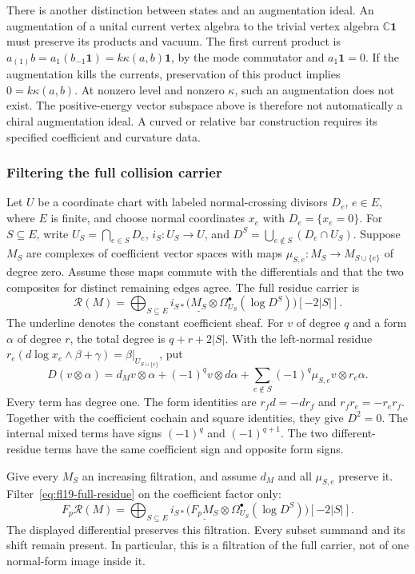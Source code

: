 There is another distinction between states and an augmentation ideal.
An augmentation of a unital current vertex algebra to the trivial vertex algebra $\mathbb C\mathbf1$ must preserve its products and vacuum.
The first current product is $a_{(1)}b=a_1(b_{-1}\mathbf1)=k\kappa(a,b)\mathbf1$, by the mode commutator and $a_1\mathbf1=0$.
If the augmentation kills the currents, preservation of this product implies $0=k\kappa(a,b)$.
At nonzero level and nonzero $\kappa$, such an augmentation does not exist.
The positive-energy vector subspace above is therefore not automatically a chiral augmentation ideal.
A curved or relative bar construction requires its specified coefficient and curvature data.

\subsubsection{Filtering the full collision carrier}

Let $U$ be a coordinate chart with labeled normal-crossing divisors $D_e$, $e\in E$, where $E$ is finite, and choose normal coordinates $x_e$ with $D_e=\{x_e=0\}$.
For $S\subseteq E$, write $U_S=\bigcap_{e\in S}D_e$, $i_S:U_S\to U$, and
$D^S=\bigcup_{e\notin S}(D_e\cap U_S)$.
Suppose $M_S$ are complexes of coefficient vector spaces with maps
$\mu_{S,e}:M_S\to M_{S\cup\{e\}}$ of degree zero.
Assume these maps commute with the differentials and that the two composites for distinct remaining edges agree.
The full residue carrier is
\begin{equation}\label{eq:fl19-full-residue}
\mathcal R(M)=\bigoplus_{S\subseteq E}
i_{S*}\bigl(\underline{M_S}\otimes\Omega^\bullet_{U_S}(\log D^S)\bigr)[-2|S|].
\end{equation}
The underline denotes the constant coefficient sheaf.
For $v$ of degree $q$ and a form $\alpha$ of degree $r$, the total degree is $q+r+2|S|$.
With the left-normal residue $r_e(d\log x_e\wedge\beta+\gamma)=\beta|_{U_{S\cup\{e\}}}$, put
\[
D(v\otimes\alpha)=d_Mv\otimes\alpha
 +(-1)^qv\otimes d\alpha
 +\sum_{e\notin S}(-1)^q\mu_{S,e}v\otimes r_e\alpha.
\]
Every term has degree one.
The form identities are $r_f d=-d r_f$ and $r_fr_e=-r_er_f$.
Together with the coefficient cochain and square identities, they give $D^2=0$.
The internal mixed terms have signs $(-1)^q$ and $(-1)^{q+1}$.
The two different-residue terms have the same coefficient sign and opposite form signs.

Give every $M_S$ an increasing filtration, and assume $d_M$ and all $\mu_{S,e}$ preserve it.
Filter~\eqref{eq:fl19-full-residue} on the coefficient factor only:
\begin{equation}\label{eq:fl19-residue-filtration}
F_p\mathcal R(M)=\bigoplus_{S\subseteq E}
i_{S*}\bigl(\underline{F_pM_S}\otimes\Omega^\bullet_{U_S}(\log D^S)\bigr)[-2|S|].
\end{equation}
The displayed differential preserves this filtration.
Every subset summand and its shift remain present.
In particular, this is a filtration of the full carrier, not of one normal-form image inside it.


